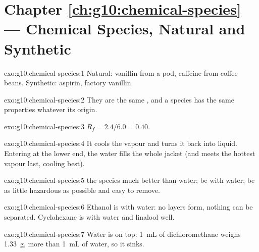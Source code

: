 \section*{Chapter \ref{ch:g10:chemical-species} --- Chemical Species, Natural and Synthetic}

\begin{solution}{exo:g10:chemical-species:1}
Natural: vanillin from a pod, caffeine from coffee beans. Synthetic:
aspirin, factory vanillin.
\end{solution}

\begin{solution}{exo:g10:chemical-species:2}
They are the same , and a species has the same
properties whatever its origin.
\end{solution}

\begin{solution}{exo:g10:chemical-species:3}
$R_f = 2.4/6.0 = 0.40$.
\end{solution}

\begin{solution}{exo:g10:chemical-species:4}
It cools the vapour and turns it back into liquid. Entering at the lower
end, the water fills the whole jacket (and meets the hottest vapour last,
cooling best).
\end{solution}

\begin{solution}{exo:g10:chemical-species:5}
 the species much better than water; be  with water;
be as little hazardous as possible and easy to remove.
\end{solution}

\begin{solution}{exo:g10:chemical-species:6}
Ethanol is  with water: no layers form, nothing can be separated.
Cyclohexane is  with water and  linalool well.
\end{solution}

\begin{solution}{exo:g10:chemical-species:7}
Water is on top: \qty{1}{mL} of dichloromethane weighs \qty{1.33}{g},
more than \qty{1}{mL} of water, so it sinks.
\end{solution}

